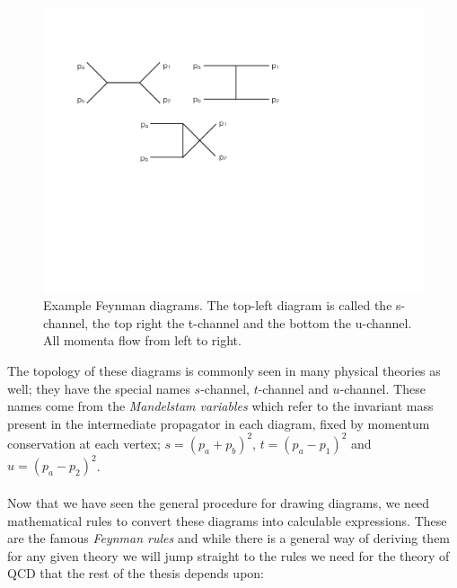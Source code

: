 \begin{figure}[t]
\centering
\includegraphics[scale=0.6]{Images/feyndiags.pdf} 
\caption{Example Feynman diagrams. The top-left diagram is called the s-channel, the top right the t-channel and the bottom the u-channel. All momenta flow from left to right.}
\label{fig:feyndiags}
\end{figure}

The topology of these diagrams is commonly seen in many physical theories as well; they have the special names $s$-channel, $t$-channel and $u$-channel. These names come from the \emph{Mandelstam variables} which refer to the invariant mass  present in the intermediate propagator in each diagram, fixed by momentum conservation at each vertex; $s = (p_a + p_b)^2$, $t = (p_a - p_1)^2$ and $u = (p_a - p_2)^2$. \\
\\
Now that we have seen the general procedure for drawing diagrams, we need mathematical rules to convert these diagrams into calculable expressions. These are the famous \emph{Feynman rules} and while there is a general way of deriving them for any given theory we will jump straight to the rules we need for the theory of QCD that the rest of the thesis depends upon: 


